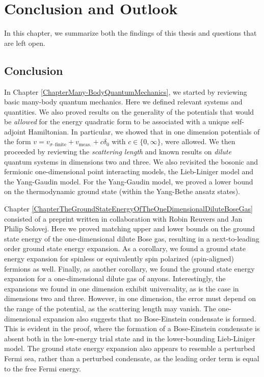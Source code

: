 \chapter{Conclusion and Outlook}
\label{ChapterConclusionAndOutlook}
In this chapter, we summarize both the findings of this thesis and questions that are left open.
\section{Conclusion}
In Chapter \ref{ChapterMany-BodyQuantumMechanics}, we started by reviewing basic many-body quantum mechanics. Here we defined relevant systems and quantities. We also proved results on the generality of the potentials that would be \emph{allowed} for the energy quadratic form to be associated with a unique self-adjoint Hamiltonian. In particular, we showed that in one dimension potentials of the form $ v=v_{\sigma\text{--finite}}+v_{\text{meas.}} +c\delta_0 $ with $ c\in\{0,\infty\} $, were allowed. We then proceeded by reviewing the \emph{scattering length} and known results on \emph{dilute} quantum systems in dimensions two and three. We also revisited the bosonic and fermionic one-dimensional point interacting models, \ie the Lieb-Liniger model and the Yang-Gaudin model.
For the Yang-Gaudin model, we proved a lower bound on the thermodynamic ground state (within the Yang-Bethe ansatz states).

Chapter \ref{ChapterTheGroundStateEnergyOfTheOneDimensionalDiluteBoseGas} consisted of a preprint written in collaboration with Robin Reuvers and Jan Philip Solovej. Here we proved matching upper and lower bounds on the ground state energy of the one-dimensional dilute Bose gas, resulting in a next-to-leading order ground state energy expansion. As a corollary, we found a ground state energy expansion for spinless or equivalently spin polarized (spin-aligned) fermions as well. Finally, as another corollary, we found the ground state energy expansion for a one-dimensional dilute gas of anyons. Interestingly, the expansions we found in one dimension exhibit universality, as is the case in dimensions two and three. However, in one dimension, the error must depend on the range of the potential, as the scattering length may vanish. The one-dimensional expansion also suggests that no Bose-Einstein condensate is formed. This is evident in the proof, where the formation of a Bose-Einstein condensate is absent both in the low-energy trial state and in the lower-bounding Lieb-Liniger model. The ground state energy expansion also appears to resemble a perturbed Fermi sea, rather than a perturbed condensate, as the leading order term is equal to the free Fermi energy.

